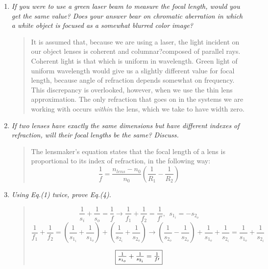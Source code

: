 \documentclass{amsart}
\begin{document}
\begin{enumerate}
\item {\textit{If you were to use a green laser beam to measure the focal length, would you get the same value? Does your answer bear on chromatic aberration in which a white object is focused as a somewhat blurred color image?}
\begin{quote}
It is assumed that, because we are using a laser, the light incident on our object lenses is coherent and columnar?composed of parallel rays. Coherent light is that which is uniform in wavelength. Green light of uniform wavelength would give us a slightly different value for focal length, because angle of refraction depends somewhat on frequency. This discrepancy is overlooked, however, when we use the thin lens approximation. The only refraction that goes on in the systems we are working with occurs \textit{within} the lens, which we take to have width zero.
\end{quote}}

\item{\textit{If two lenses have exactly the same dimensions but have different indexes of refraction, will their focal lengths be the same? Discuss.}
\begin{quote}
The lensmaker's equation states that the focal length of a lens is proportional to its index of refraction, in the following way:
$$ \frac{1}{f} = \dfrac{n_{lens} - n_0}{n_0}\left(\frac{1}{R_1} - \frac{1}{R_2}\right) $$
\end{quote}}

\item{\textit{Using Eq.(1) twice, prove Eq.(4).}
\begin{quote}


$$\frac{1}{s_i}+ \frac{1}{s_o} = \frac{1}{f} \rightarrow \frac{1}{f_1}+ \frac{1}{f_2} = \frac{1}{f \prime} , \ \ s_{1_i} = - s_{2_o} $$
$$ \frac{1}{f_1}+ \frac{1}{f_2} = \left(\frac{1}{s_{1_i}}+ \frac{1}{s_{1_o}}\right) + \left(\frac{1}{s_{2_i}}+ \frac{1}{s_{2_o}} \right) \rightarrow  \left(\frac{1}{s_{2_o}} -  \frac{1}{s_{2_o}}\right) +  \frac{1}{s_{1_o}} +  \frac{1}{s_{2_i}} =  \frac{1}{s_{1_o}} +  \frac{1}{s_{2_i}}$$

\[ \boxed{
$$ \frac{1}{s_{1_o}} +  \frac{1}{s_{2_i}} = \frac{1}{f \prime}$$}
\]

\end{quote}}

\end{enumerate}
\end{document}

